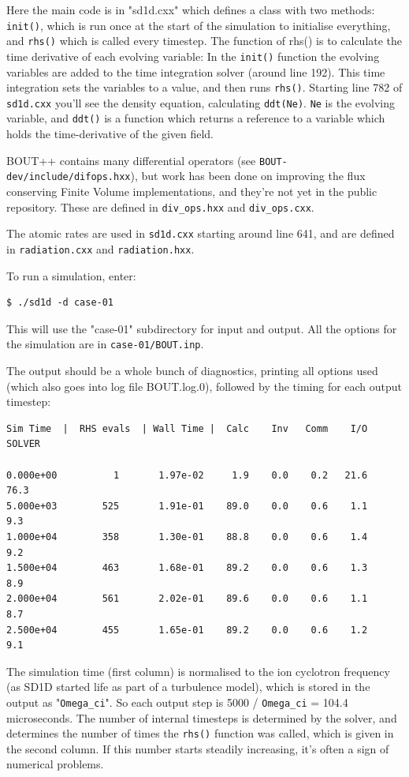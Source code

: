 \documentclass[12pt,a4paper]{article}
\begin{document}
Here the main code is in "sd1d.cxx" which defines a class with two methods: \texttt{init()}, which is run once at the start of the simulation to initialise everything, and \texttt{rhs()} which is called every timestep. The function of rhs() is to calculate the time derivative of each evolving variable: In the \texttt{init()} function the evolving variables are added to the time integration solver (around line 192). This time integration sets the variables to a value, and then runs \texttt{rhs()}. Starting line 782 of
\texttt{sd1d.cxx} you'll see the density equation, calculating \texttt{ddt(Ne)}. \texttt{Ne} is the evolving variable, and \texttt{ddt()} is a function which returns a reference to a variable which holds the time-derivative of the given field. 

BOUT++ contains many differential operators (see \texttt{BOUT-dev/include/difops.hxx}), but work has been done on improving the flux conserving Finite Volume implementations, and they're not yet in the public repository. These are defined in \texttt{div\_ops.hxx} and \texttt{div\_ops.cxx}.

The atomic rates are used in \texttt{sd1d.cxx} starting around line 641, and are defined in \texttt{radiation.cxx} and \texttt{radiation.hxx}.


To run a simulation, enter:
\begin{verbatim}
$ ./sd1d -d case-01
\end{verbatim}
This will use the "case-01" subdirectory for input and output. All the options for the simulation are in \texttt{case-01/BOUT.inp}. 

The output should be a whole bunch of diagnostics, printing all options used (which also goes into log file BOUT.log.0), followed by the timing for each output timestep:

\begin{verbatim}
Sim Time  |  RHS evals  | Wall Time |  Calc    Inv   Comm    I/O   SOLVER

0.000e+00          1       1.97e-02     1.9    0.0    0.2   21.6   76.3
5.000e+03        525       1.91e-01    89.0    0.0    0.6    1.1    9.3
1.000e+04        358       1.30e-01    88.8    0.0    0.6    1.4    9.2
1.500e+04        463       1.68e-01    89.2    0.0    0.6    1.3    8.9
2.000e+04        561       2.02e-01    89.6    0.0    0.6    1.1    8.7
2.500e+04        455       1.65e-01    89.2    0.0    0.6    1.2    9.1
\end{verbatim}

The simulation time (first column) is normalised to the ion cyclotron frequency (as SD1D started life as part of a turbulence model),
which is stored in the output as  "\texttt{Omega\_ci}". So each output step is 5000 / \texttt{Omega\_ci} = 104.4 microseconds.
The number of internal timesteps is determined by the solver, and determines the number of times the \texttt{rhs()}
function was called, which is given in the second column. If this number starts steadily increasing, it's often a sign of numerical problems.
\end{document}

